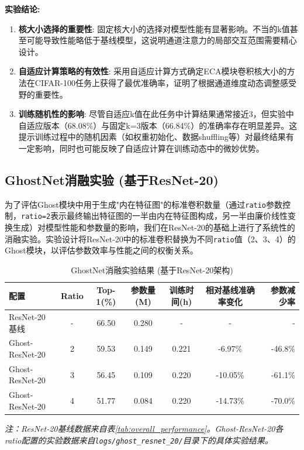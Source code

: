\documentclass[a4paper]{article}
\begin{document}
\textbf{实验结论:}
\begin{enumerate}
    \item \textbf{核大小选择的重要性}: 固定核大小的选择对模型性能有显著影响。不当的k值甚至可能导致性能略低于基线模型，这说明通道注意力的局部交互范围需要精心设计。
    \item \textbf{自适应计算策略的有效性}: 采用自适应计算方式确定ECA模块卷积核大小的方法在CIFAR-100任务上获得了最优准确率，证明了根据通道维度动态调整感受野的重要性。
    \item \textbf{训练随机性的影响}: 尽管自适应k值在此任务中计算结果通常接近3，但实验中自适应版本（68.08\%）与固定k=3版本（66.84\%）的准确率存在明显差异。这提示训练过程中的随机因素（如权重初始化、数据shuffling等）对最终结果有一定影响，同时也可能反映了自适应计算在训练动态中的微妙优势。
\end{enumerate}

\subsection{GhostNet消融实验 (基于ResNet-20)}
为了评估Ghost模块中用于生成"内在特征图"的标准卷积数量（通过\texttt{ratio}参数控制，\texttt{ratio=2}表示最终输出特征图的一半由内在特征图构成，另一半由廉价线性变换生成）对模型性能和参数量的影响，我们在ResNet-20的基础上进行了系统性的消融实验。实验设计将ResNet-20中的标准卷积替换为不同\texttt{ratio}值（2、3、4）的Ghost模块，以评估参数效率与性能之间的权衡关系。

\begin{table}[H]
\centering
\caption{GhostNet消融实验结果 (基于ResNet-20架构)}
\label{tab:ghost_ablation}
\begin{tabular}{lcccccr}
\toprule
\textbf{配置} & \textbf{Ratio} & \textbf{Top-1(\%)} & \textbf{参数量(M)} & \textbf{训练时间(h)} & \textbf{相对基线准确率变化} & \textbf{参数减少率} \\
\midrule
ResNet-20 基线 & - & 66.50 & 0.280 & - & - & - \\
Ghost-ResNet-20 & 2 & 59.53 & 0.149 & 0.221 & -6.97\% & -46.8\% \\
Ghost-ResNet-20 & 3 & 56.45 & 0.109 & 0.220 & -10.05\% & -61.1\% \\
Ghost-ResNet-20 & 4 & 51.77 & 0.084 & 0.220 & -14.73\% & -70.0\% \\
\bottomrule
\end{tabular}
\end{table}
\textit{注：ResNet-20基线数据来自表\ref{tab:overall_performance}。Ghost-ResNet-20各ratio配置的实验数据来自\texttt{logs/ghost\_resnet\_20/}目录下的具体实验结果。}
\end{document}
